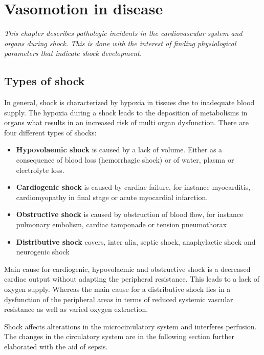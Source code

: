 \chapter{Vasomotion in disease}
\textit{This chapter describes pathologic incidents in the cardiovascular system and organs during shock. This is done with the interest of finding physiological parameters that indicate shock development.}

\section{Types of shock}
In general, shock is characterized by hypoxia in tissues due to inadequate blood supply. The hypoxia during a shock leads to the deposition of metabolisms in organs what results in an increased risk of multi organ dysfunction. 
There are four different types of shocks:\cite{lauridsen2015,vincent2013}
\begin{itemize}
	\item \textbf{Hypovolaemic shock} is caused by a lack of volume. Either as a consequence of blood loss (hemorrhagic shock) or of water, plasma or electrolyte loss.
	\item \textbf{Cardiogenic shock} is caused by cardiac failure, for instance myocarditis, cardiomyopathy in final stage or acute myocardial infarction.
	\item \textbf{Obstructive shock} is caused by obstruction of blood flow, for instance pulmonary embolism, cardiac tamponade or tension pneumothorax 
	\item \textbf{Distributive shock} covers, inter alia, septic shock, anaphylactic shock and neurogenic shock
\end{itemize}

Main cause for cardiogenic, hypovolaemic and obstructive shock is a decreased cardiac output without adapting the peripheral resistance. This leads to a lack of oxygen supply.
Whereas the main cause for a distributive shock lies in a dysfunction of the peripheral areas in terms of reduced systemic vascular resistance as well as varied oxygen extraction.\cite{vincent2013}

Shock affects alterations in the microcirculatory system and interferes perfusion\cite{maier2013}. The changes in the circulatory system are in the following section further elaborated with the aid of sepsis.